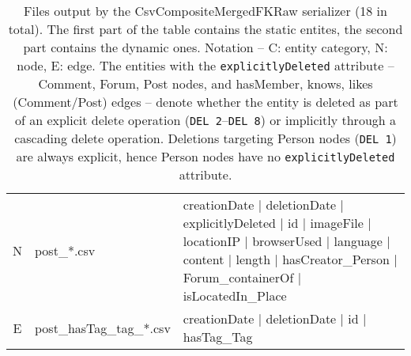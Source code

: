 \begin{table}[htb]
{\begin{tabular}{|c|l|l|}
            \hline
            N                    & post\_*.csv                          & creationDate | deletionDate | explicitlyDeleted | id | imageFile | locationIP | browserUsed | language | content | length | hasCreator\_Person | Forum\_containerOf | isLocatedIn\_Place \\
            E                    & post\_hasTag\_tag\_*.csv             & creationDate | deletionDate | id | hasTag\_Tag                                                                                                                                           \\
            \hline
        \end{tabular}}
    \caption{Files output by the CsvCompositeMergedFKRaw serializer (18 in total). The first part of the table contains the static entites, the second part contains the dynamic ones. Notation -- C: entity category, N: node, E: edge.
        The entities with the \texttt{explicitlyDeleted} attribute -- Comment, Forum, Post nodes, and hasMember, knows, likes (Comment/Post) edges -- denote whether the entity is deleted as part of an explicit delete operation (\texttt{DEL 2}--\texttt{DEL 8}) or implicitly through a cascading delete operation. Deletions targeting Person nodes (\texttt{DEL 1}) are always explicit, hence Person nodes have no \texttt{explicitlyDeleted} attribute.}
    \label{table:csv-raw}
\end{table}
